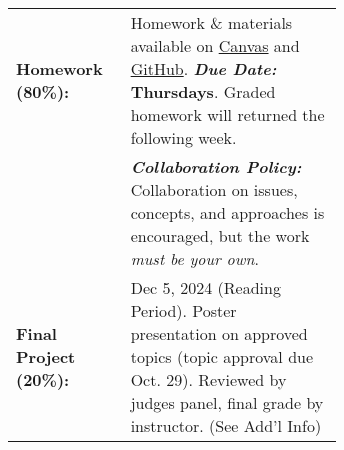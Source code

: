 \begin{tabular}{l p{0.65\linewidth}}
 
\textbf{Homework (80\%):}       &  Homework \& materials 
                                   available on \href{\CanvasURL}{Canvas} and
                                   \href{\GitHubURL}{GitHub}. \emph{\textbf{Due Date:}} \textbf{Thursdays}. 
                                  Graded homework will returned the following week. \\
                                & \emph{\textbf{Collaboration Policy:}} Collaboration on issues,
                                  concepts, and approaches is encouraged, but the work
                                  \textit{must be your own}.\\

\textbf{Final Project (20\%):}  & Dec 5, 2024 (Reading Period). Poster presentation on approved topics (topic approval due Oct. 29). Reviewed by judges panel, final grade by instructor. (See Add'l Info) \\

\end{tabular}